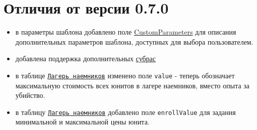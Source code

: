 \section{Отличия от версии 0.7.0}
\begin{itemize}
\item в параметры шаблона добавлено поле \hyperref[customParameters]{{CustomParameters}} для описания дополнительных параметров шаблона, доступных для выбора пользователем.
\item добавлена поддержка дополнительных \hyperref[subraceTypes]{субрас}
\item в таблице \hyperref[mercenary]{\texttt{Лагерь наемников}} изменено поле \texttt{value} - теперь обозначает максимальную стоимость всех юнитов в лагере наемников, вместо опыта за убийство.
\item в таблицу \hyperref[mercenary]{\texttt{Лагерь наемников}} добавлено поле \texttt{enrollValue} для задания минимальной и максимальной цены юнита.
\end{itemize}